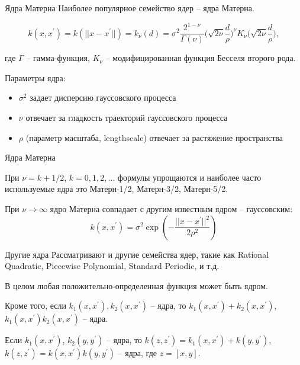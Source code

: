 \documentclass[fullscreen=true, bookmarks=true, hyperref={pdfencoding=unicode}]{beamer}
\begin{document}
\begin{frame}{Ядра Матерна}
    Наиболее популярное семейство ядер -- ядра Матерна.

    $$k(x, x^\prime) = k(||x - x^\prime||) = k_\nu(d) = \sigma^2\frac{2^{1-\nu}}{\Gamma(\nu)}\Bigg(\sqrt{2\nu}\frac{d}{\rho}\Bigg)^\nu K_\nu\Bigg(\sqrt{2\nu}\frac{d}{\rho}\Bigg),$$

    где $\Gamma$ -- гамма-функция, $K_\nu$ -- модифицированная функция Бесселя второго рода.

    Параметры ядра:
    \begin{itemize}
        \item<1-> $\sigma^2$ задает дисперсию гауссовского процесса
        \item<2-> $\nu$ отвечает за гладкость траекторий гауссовского процесса
        \item<3-> $\rho$ (параметр масштаба, lengthscale) отвечает за растяжение пространства
    \end{itemize}

\end{frame}

\begin{frame}{Ядра Матерна}

    При $\nu = k + 1/2$, $k = 0, 1, 2, \ldots$ формулы упрощаются и наиболее часто используемые ядра это Матерн-1/2, Матерн-3/2, Матерн-5/2.

    При $\nu \to \infty$ ядро Матерна совпадает с другим известным ядром -- гауссовским:
    $$k(x, x^\prime) = \sigma^2 \exp\left(-\frac{||x - x^\prime||^2}{2 \rho^2}\right)$$

\end{frame}

\begin{frame}{Другие ядра}
    Рассматривают и другие семейства ядер, такие как Rational Quadratic, Piecewise Polynomial, Standard Periodic, и т.д.

    В целом любая положительно-определенная функция может быть ядром.

    \pause
    Кроме того, если $k_1(x, x^\prime), k_2(x, x^\prime)$ -- ядра, то $k_1(x, x^\prime) + k_2(x, x^\prime)$, $k_1(x, x^\prime) k_2(x, x^\prime)$ -- ядра.

    Если $k_1(x, x^\prime)$, $k_2(y, y^\prime)$ -- ядра, то $k(z, z^\prime) = k_1(x, x^\prime) + k(y, y^\prime)$, $k(z, z^\prime) = k(x, x^\prime) k(y, y^\prime)$ -- ядра, где $z = [x, y]$.
\end{frame}
\end{document}
